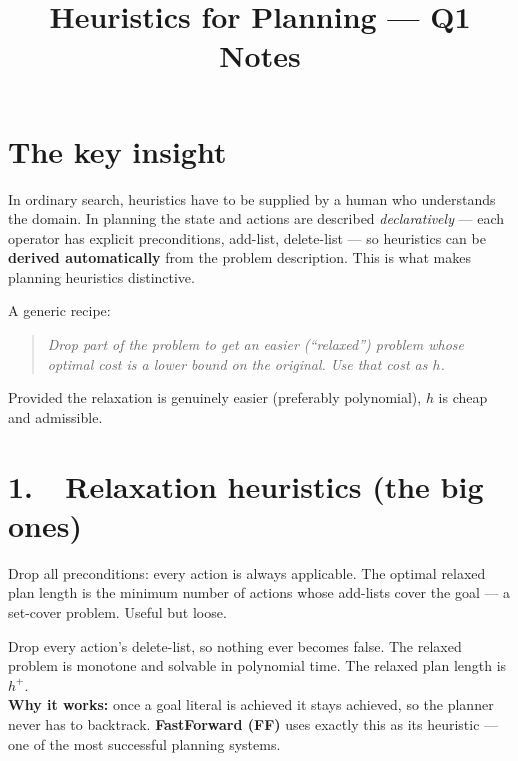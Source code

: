 \documentclass[11pt,a4paper]{article}
\title{\vspace{-1.5cm}Heuristics for Planning --- Q1 Notes}
\author{}
\date{}
\begin{document}
\maketitle
\vspace{-1cm}

\section*{The key insight}

In ordinary search, heuristics have to be supplied by a human who understands the domain. In planning the state and actions are described \emph{declaratively} --- each operator has explicit preconditions, add-list, delete-list --- so heuristics can be \textbf{derived automatically} from the problem description. This is what makes planning heuristics distinctive.

A generic recipe:
\begin{quote}
  \textit{Drop part of the problem to get an easier (``relaxed'') problem whose optimal cost is a lower bound on the original. Use that cost as $h$.}
\end{quote}
Provided the relaxation is genuinely easier (preferably polynomial), $h$ is cheap and admissible.

\section*{1.\ \ Relaxation heuristics (the big ones)}

\begin{tcolorbox}[colback=gray!5,colframe=gray!50!black,title=Ignore preconditions]
Drop all preconditions: every action is always applicable. The optimal relaxed plan length is the minimum number of actions whose add-lists cover the goal --- a set-cover problem. Useful but loose.
\end{tcolorbox}

\begin{tcolorbox}[colback=gray!5,colframe=gray!50!black,title=Ignore delete lists (delete-relaxation)]
Drop every action's delete-list, so nothing ever becomes false. The relaxed problem is monotone and solvable in polynomial time. The relaxed plan length is $h^+$.
\\[2pt]
\textbf{Why it works:} once a goal literal is achieved it stays achieved, so the planner never has to backtrack. \textbf{FastForward (FF)} uses exactly this as its heuristic --- one of the most successful planning systems.
\end{tcolorbox}
\end{document}
